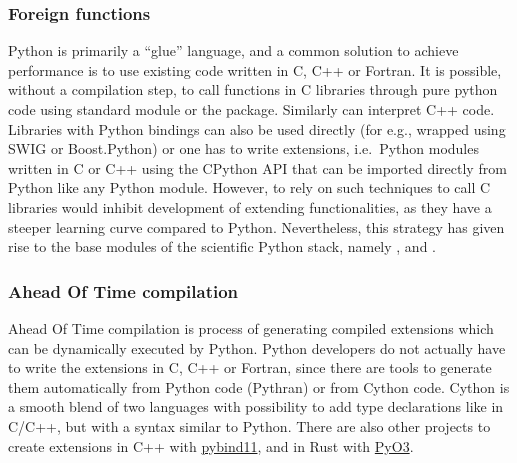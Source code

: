 \subsubsection{Foreign functions}
%
Python is primarily a ``glue'' language, and a common solution to achieve
performance is to use existing code written in C, C++ or Fortran.
%
It is possible, without a compilation step, to call functions in C libraries
through pure python code using  standard module or the 
package.
%
Similarly \href{https://cppyy.readthedocs.io}{} can interpret C++
code. Libraries with Python bindings can also be used directly (for e.g.,
wrapped using SWIG or Boost.Python) or one has to write extensions, i.e.\
Python modules written in C or C++ using the CPython API that can be imported
directly from Python like any Python module.
%
However, to rely on such techniques to call C libraries would inhibit
development of extending functionalities, as they have a steeper learning curve
compared to Python.
%
Nevertheless, this strategy has given rise to the base modules of the
scientific Python stack, namely \Numpy, \Scipy and \pack{Matplotlib}.

\subsubsection{Ahead Of Time compilation}
Ahead Of Time compilation is process of generating compiled extensions which
can be dynamically executed by Python.
%
Python developers do not actually have to write the extensions in C, C++ or
Fortran, since there are tools to generate them automatically from Python code
(Pythran) or from Cython code. Cython \citep{behnel_cython2011} is a smooth
blend of two languages with possibility to add type declarations like in C/C++,
but with a syntax similar to Python.
%
There are also other projects to create extensions in C++ with
\href{https://github.com/pybind/pybind11/}{pybind11}, and in Rust with
\href{https://github.com/PyO3}{PyO3}.


